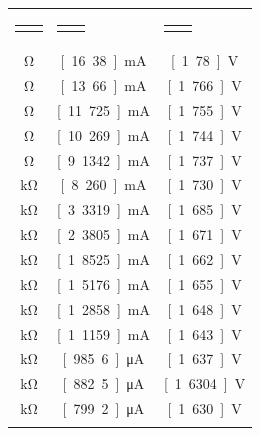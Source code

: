 \documentclass[11pt,a4paper]{article}
\begin{document}
\begin{longtable}[c]{@{}ccc@{}}
    \toprule\addlinespace
    \begin{tabular}{ll}$R_{3}$
    \end{tabular} & \begin{tabular}{ll}$I_{M1}$
\end{tabular} & \begin{tabular}{ll}$V_{M2}$
\end{tabular}
\\\addlinespace
\midrule\endhead
\unit[500]{\si{\ohm}} & \unit[16.38]{\si{\unit{\mA}}} & \unit[1.78]{\si{\volt}}
\\\addlinespace
\unit[600]{\si{\ohm}} & \unit[13.66]{\si{\unit{\mA}}} & \unit[1.766]{\si{\volt}}
\\\addlinespace
\unit[700]{\si{\ohm}} & \unit[11.725]{\si{\unit{\mA}}} & \unit[1.755]{\si{\volt}}
\\\addlinespace
\unit[800]{\si{\ohm}} & \unit[10.269]{\si{\unit{\mA}}} & \unit[1.744]{\si{\volt}}
\\\addlinespace
\unit[900]{\si{\ohm}} & \unit[9.1342]{\si{\unit{\mA}}} & \unit[1.737]{\si{\volt}}
\\\addlinespace
\unit[1]{\si{\kohm}} & \unit[8.260]{\si{\unit{\mA}}} & \unit[1.730]{\si{\volt}}
\\\addlinespace
\unit[2]{\si{\kohm}} & \unit[3.3319]{\si{\unit{\mA}}} & \unit[1.685]{\si{\volt}}
\\\addlinespace
\unit[3]{\si{\kohm}} & \unit[2.3805]{\si{\unit{\mA}}} & \unit[1.671]{\si{\volt}}
\\\addlinespace
\unit[4]{\si{\kohm}} & \unit[1.8525]{\si{\unit{\mA}}} & \unit[1.662]{\si{\volt}}
\\\addlinespace
\unit[5]{\si{\kohm}} & \unit[1.5176]{\si{\unit{\mA}}} & \unit[1.655]{\si{\volt}}
\\\addlinespace
\unit[6]{\si{\kohm}} & \unit[1.2858]{\si{\unit{\mA}}} & \unit[1.648]{\si{\volt}}
\\\addlinespace
\unit[7]{\si{\kohm}} & \unit[1.1159]{\si{\unit{\mA}}} & \unit[1.643]{\si{\volt}}
\\\addlinespace
\unit[8]{\si{\kohm}} & \unit[985.6]{\si{\unit{\uA}}} & \unit[1.637]{\si{\volt}}
\\\addlinespace
\unit[9]{\si{\kohm}} & \unit[882.5]{\si{\unit{\uA}}} & \unit[1.6304]{\si{\volt}}
\\\addlinespace
\unit[10]{\si{\kohm}} & \unit[799.2]{\si{\unit{\uA}}} & \unit[1.630]{\si{\volt}}
\\\addlinespace

\end{longtable}
\end{document}
